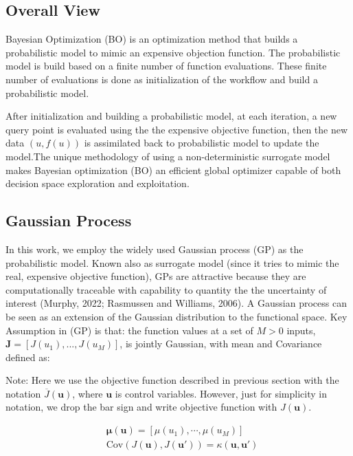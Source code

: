 \documentclass[]{elsarticle} %
\begin{document}
\hypertarget{overall-view}{%
\subsection{Overall View}\label{overall-view}}

Bayesian Optimization (BO) is an optimization method that builds a probabilistic model to mimic an expensive objection function. The probabilistic model is build based on a finite number of function evaluations. These finite number of evaluations is done as initialization of the workflow and build a probabilistic model.

After initialization and building a probabilistic model, at each iteration, a new query point is evaluated using the the expensive objective function, then the new data \((u,f(u))\) is assimilated back to probabilistic model to update the model.The unique methodology of using a non-deterministic surrogate model makes Bayesian optimization (BO) an efficient global optimizer capable of both decision space exploration and exploitation.

\hypertarget{gaussian-process}{%
\subsection{Gaussian Process}\label{gaussian-process}}

In this work, we employ the widely used Gaussian process (GP) as the probabilistic model. Known also as surrogate model (since it tries to mimic the real, expensive objective function), GPs are attractive because they are computationally traceable with capability to quantity the the uncertainty of interest (Murphy, 2022; Rasmussen and Williams, 2006). A Gaussian process can be seen as an extension of the Gaussian distribution to the functional space. Key Assumption in (GP) is that: the function values at a set of \(M > 0\) inputs, \(\mathbf{J} = [J({u_1}), ...,J(u_M)]\), is jointly Gaussian, with mean and Covariance defined as:

Note: Here we use the objective function described in previous section with the notation \(\overline{J}(\mathbf{u})\), where \(\mathbf{u}\) is control variables. However, just for simplicity in notation, we drop the bar sign and write objective function with \(J(\mathbf{u})\).

\begin{equation}
  \begin{split}
& \mathbf{\mu(u)} = [\mu(u_1),\cdots,\mu(u_M)] \\
& \text{Cov}(J(\mathbf{u}),J(\mathbf{u'}))= \kappa(\mathbf{u},\mathbf{u'})
  \end{split}
\label{eq:mean_cov}
\end{equation}
\end{document}
